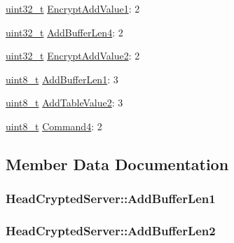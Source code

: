\begin{DoxyCompactItemize}
\item 
\hyperlink{stdint_8h_a435d1572bf3f880d55459d9805097f62}{uint32\+\_\+t} \hyperlink{structHeadCryptedServer_ab5303f4e2cc68d5c7368773b1f323ce0}{Encrypt\+Add\+Value1}\+: 2
\item 
\hyperlink{stdint_8h_a435d1572bf3f880d55459d9805097f62}{uint32\+\_\+t} \hyperlink{structHeadCryptedServer_a1c0f7e20d520855615230a25f4486586}{Add\+Buffer\+Len4}\+: 2
\item 
\hyperlink{stdint_8h_a435d1572bf3f880d55459d9805097f62}{uint32\+\_\+t} \hyperlink{structHeadCryptedServer_adbf6980999ba39055a0d1cce76181f21}{Encrypt\+Add\+Value2}\+: 2
\item 
\hyperlink{stdint_8h_aba7bc1797add20fe3efdf37ced1182c5}{uint8\+\_\+t} \hyperlink{structHeadCryptedServer_a669431eb27313b07d0cc97aab78751d6}{Add\+Buffer\+Len1}\+: 3
\item 
\hyperlink{stdint_8h_aba7bc1797add20fe3efdf37ced1182c5}{uint8\+\_\+t} \hyperlink{structHeadCryptedServer_a0e5700f58abaec3c47998dfe6eb19aa2}{Add\+Table\+Value2}\+: 3
\item 
\hyperlink{stdint_8h_aba7bc1797add20fe3efdf37ced1182c5}{uint8\+\_\+t} \hyperlink{structHeadCryptedServer_a8540cd81ede34402268047ee2ab05eac}{Command4}\+: 2
\end{DoxyCompactItemize}


\subsection{Member Data Documentation}
\subsubsection[{\texorpdfstring{Add\+Buffer\+Len1}{AddBufferLen1}}]{ Head\+Crypted\+Server\+::\+Add\+Buffer\+Len1}\hypertarget{structHeadCryptedServer_a669431eb27313b07d0cc97aab78751d6}{}\label{structHeadCryptedServer_a669431eb27313b07d0cc97aab78751d6}
\subsubsection[{\texorpdfstring{Add\+Buffer\+Len2}{AddBufferLen2}}]{ Head\+Crypted\+Server\+::\+Add\+Buffer\+Len2}\hypertarget{structHeadCryptedServer_a57e7f8eecda07e71386e9bf563069d06}{}\label{structHeadCryptedServer_a57e7f8eecda07e71386e9bf563069d06}
